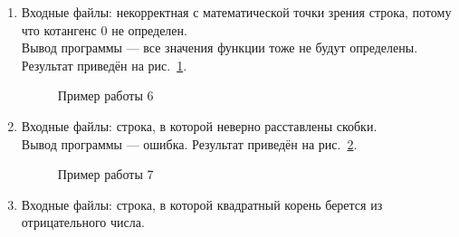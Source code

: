 \documentclass[12pt, a4paper]{article}
\begin{document}
\begin{enumerate}
	\item Входные файлы: некорректная с математической точки зрения 
	строка, потому что котангенс 0 не определен.\\
	Вывод программы --- все значения функции тоже не будут определены.
	Результат приведён на рис.~\ref{img:grap6}.
	\begin{figure}[h]
  		\caption{Пример работы 6}
  		\label{img:grap6}
	\end{figure}
	\item Входные файлы: строка, в которой неверно расставлены скобки.\\
	Вывод программы --- ошибка. Результат 
	приведён на рис.~\ref{img:grap7}.
	\begin{figure}[h]
  		\caption{Пример работы 7}
  		\label{img:grap7}
	\end{figure}
	\newpage
	\item Входные файлы: строка, в которой квадратный корень
	берется из отрицательного числа.\\

\end{enumerate}
\end{document}

